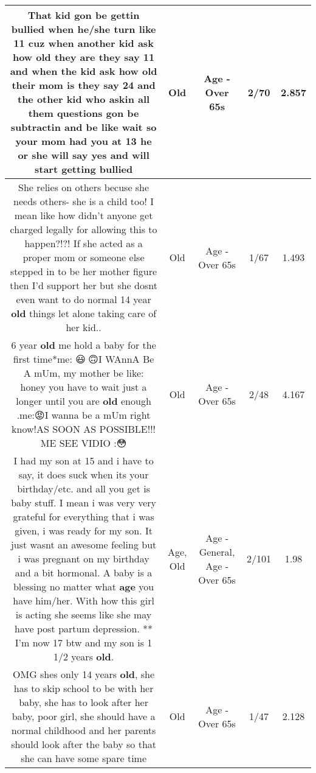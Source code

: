 \documentclass[11pt]{article}
\newlength\mylength
\begin{document}
\begin{center}
\begin{longtable}{|C{.65\mylength}|C{.30\mylength}|C{.12\mylength}|C{.12\mylength}|C{.12\mylength}|}
  \small That kid gon be gettin bullied when he/she turn like 11 cuz when another kid ask how \textbf{old} they are they say 11 and when the kid ask how \textbf{old} their mom is they say 24 and the other kid who askin all them questions gon be subtractin and be like wait so your mom had you at 13 he or she will say yes and will start getting bullied\normalsize   & Old & Age - Over 65s & 2/70 & 2.857 \\  \hline
  \small She relies on others becuse she needs others- she is a child too! I mean like how didn't anyone get charged legally for allowing this to happen?!?! If she acted as a proper mom or someone else stepped in to be her mother figure then I'd support her but she dosnt even want to do normal 14 year \textbf{old} things let alone taking care of her kid..\normalsize   & Old & Age - Over 65s & 1/67 & 1.493 \\  \hline
  \small * 6 year \textbf{old} me hold a baby for the first time*me: 😃🤔🙃I WAnnA Be A mUm, my mother be like: honey you have to wait just a longer until you are \textbf{old} enough .me:😡I wanna be a mUm right know!AS SOON AS POSSIBLE!!! ME SEE VIDIO :😳\normalsize   & Old & Age - Over 65s & 2/48 & 4.167 \\  \hline
  \small I had my son at 15 and i have to say, it does suck when its your birthday/etc. and all you get is baby stuff. I mean i was very very grateful for everything that i was given, i was ready for my son. It just wasnt an awesome feeling but i was pregnant on my birthday and a bit hormonal. A baby is a blessing no matter what \textbf{age} you have him/her. With how this girl is acting she seems like she may have post partum depression.     **  I'm now 17 btw and my son is 1 1/2 years \textbf{old}.\normalsize   & Age, Old & Age - General, Age - Over 65s & 2/101 & 1.98 \\  \hline
  \small OMG shes only 14 years \textbf{old}, she has to skip school to be with her baby, she has to look after her baby, poor girl, she should have a normal childhood and her parents should look after the baby so that she can have some spare time\normalsize   & Old & Age - Over 65s & 1/47 & 2.128 \\  \hline

\end{longtable}
\end{center}
\end{document}
